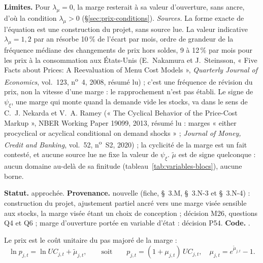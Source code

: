 \documentclass[11pt,a4paper]{article}
\newcommand{\limites}{\par\noindent\textbf{Limites.} }
\newcommand{\code}[1]{\texttt{\detokenize{#1}}}
\newcommand{\tracabilite}[3]{\par\smallskip\noindent\textbf{Statut.} #1. \textbf{Provenance.} #2. \textbf{Code.} \code{#3}.}
\begin{document}
\begin{lecture}[marge]
\limites Pour $\lambda_\mu = 0$, la marge resterait à sa valeur d'ouverture, sans ancre, d'où la condition $\lambda_\mu > 0$ (\S\ref{sec:prix-conditions}). \emph{Sources.} La forme exacte de l'équation est une construction du projet, sans source lue. La valeur indicative $\lambda_\mu = 1{,}2$ par an résorbe 10\,\% de l'écart par mois, ordre de grandeur de la fréquence médiane des changements de prix hors soldes, 9 à 12\,\% par mois pour les prix à la consommation aux États-Unis (E.~Nakamura et J.~Steinsson, « Five Facts about Prices: A Reevaluation of Menu Cost Models », \emph{Quarterly Journal of Economics}, vol.~123, n\textsuperscript{o}~4, 2008, résumé lu) ; c'est une fréquence de révision du prix, non la vitesse d'une marge : le rapprochement n'est pas établi. Le signe de $\psi_\xi$, une marge qui monte quand la demande vide les stocks, va dans le sens de C.~J. Nekarda et V.~A. Ramey (« The Cyclical Behavior of the Price-Cost Markup », NBER Working Paper 19099, 2013, résumé lu : marges « either procyclical or acyclical conditional on demand shocks » ; \emph{Journal of Money, Credit and Banking}, vol.~52, n\textsuperscript{o}~S2, 2020) ; la cyclicité de la marge est un fait contesté, et aucune source lue ne fixe la valeur de $\psi_\xi$. $\tilde\mu$ est de signe quelconque : aucun domaine au-delà de sa finitude (tableau~\ref{tab:variables-blocs}), aucune borne.
\tracabilite{approchée}{nouvelle (fiche, \S~3.M, \S~3.N-3 et \S~3.N-4) : construction du projet, ajustement partiel ancré vers une marge visée sensible aux stocks, la marge visée étant un choix de conception ; décision M26, questions Q4 et Q6 ; marge d'ouverture portée en variable d'état : décision P54}{nations.blocs.prix.marge}
\end{lecture}
Le prix est le coût unitaire du pas majoré de la marge :
\begin{equation}\label{eq:prix-prix-du-pas}
\ln p_{j,t} = \ln \mathit{UC}_{j,t} + \tilde\mu_{j,t}, \qquad\text{soit}\qquad p_{j,t} = (1 + \mu_{j,t})\,\mathit{UC}_{j,t}, \quad \mu_{j,t} = e^{\tilde\mu_{j,t}} - 1 .
\end{equation}
\end{document}
